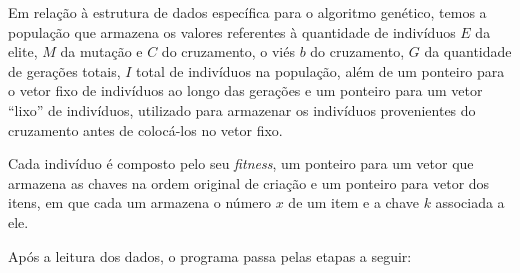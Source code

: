 \documentclass[12pt, openright, twoside, a4paper, english, brazilian]{USPSC-classe/USPSC}
\begin{document}
Em relação à estrutura de dados específica para o algoritmo genético, temos a população que armazena os valores referentes à quantidade de indivíduos $E$ da elite, $M$ da mutação e $C$ do cruzamento, o viés $b$ do cruzamento, $G$ da quantidade de gerações totais, $I$ total de indivíduos na população, além de um ponteiro para o vetor fixo de indivíduos ao longo das gerações e um ponteiro para um vetor ``lixo'' de indivíduos, utilizado para armazenar os indivíduos provenientes do cruzamento antes de colocá-los no vetor fixo.

Cada indivíduo é composto pelo seu {\it fitness}, um ponteiro para um vetor que armazena as chaves na ordem original de criação e um ponteiro para vetor dos itens, em que cada um armazena o número $x$ de um item e a chave $k$ associada a ele.

Após a leitura dos dados, o programa passa pelas etapas a seguir:
\end{document}
